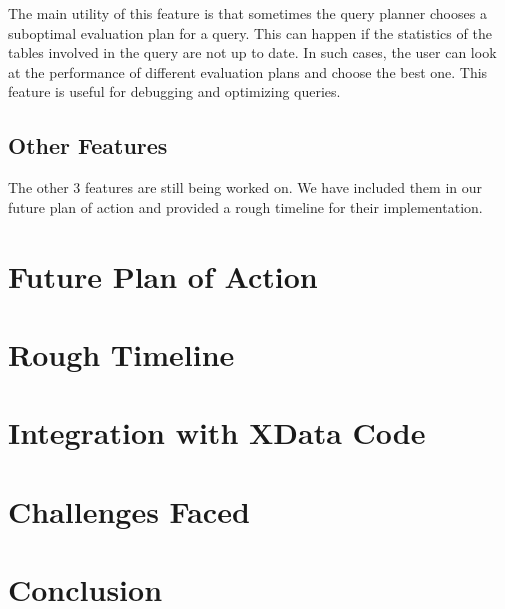 \documentclass{article}
\begin{document}
The main utility of this feature is that sometimes the query planner chooses a suboptimal evaluation plan for a query. This can happen if the statistics of the tables involved in the query are not up to date. In such cases, the user can look at the performance of different evaluation plans and choose the best one. This feature is useful for debugging and optimizing queries.


\subsection{Other Features}

The other 3 features are still being worked on. We have included them in our future plan of action and provided a rough timeline for their implementation.

\section{Future Plan of Action}

\section{Rough Timeline}

\section{Integration with XData Code}

\section{Challenges Faced}

\section{Conclusion}

    
\end{document}
